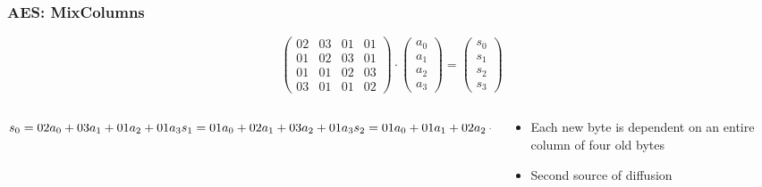 \documentclass[12pt]{beamer}
\begin{document}
\begin{frame}
\frametitle{AES: MixColumns}

\[ \left( \begin{array}{cccc}
02 & 03 & 01 & 01 \\
01 & 02 & 03 & 01 \\
01 & 01 & 02 & 03 \\
03 & 01 & 01 & 02\end{array} \right)
\cdot
\left( \begin{array}{c}
a_0 \\
a_1 \\
a_2 \\
a_3\end{array} \right)
=
\left( \begin{array}{c}
s_0 \\
s_1 \\
s_2 \\
s_3\end{array} \right)
\]

\begin{columns}
\begin{column}{0.5\textwidth}
\pause
\begin{center}
$
s_0 = {02}a_0+{03}a_1+{01}a_2+{01}a_3 \\[0pt]
s_1 = {01}a_0+{02}a_1+{03}a_2+{01}a_3 \\[0pt]
s_2 = {01}a_0+{01}a_1+{02}a_2+{03}a_3 \\[0pt]
s_3 = {03}a_0+{01}a_1+{01}a_2+{02}a_3 \\[0pt]
$
\end{center}
\end{column}
\begin{column}{0.5\textwidth}
\begin{itemize}
\pause
\item Each new byte is dependent on an entire column of four old bytes
\item Second source of diffusion
\end{itemize}
\end{column}
\end{columns}
\end{frame}
\end{document}
